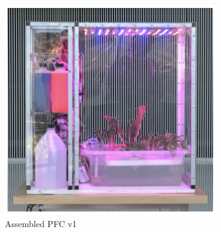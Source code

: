 \begin{figure}[h]
    \centering
    \begin{subfigure}[b]{0.08\textwidth}
        \hfill
    \end{subfigure}
    \begin{subfigure}[b]{0.40\textwidth}
        \centering
        \includegraphics[width=\textwidth]{../assets/pfc-built.png}
        \caption{Assembled PFC v1}
        \label{fig:pfc-built}
    \end{subfigure}
    \hfill
    \begin{subfigure}[b]{0.26\textwidth}
        \centering

\end{subfigure}
\end{figure}
